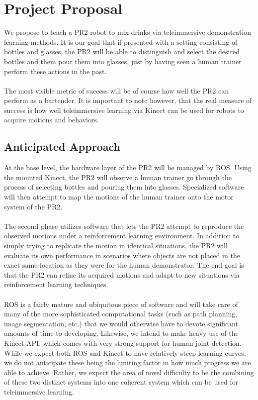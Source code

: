 \documentclass{sig-alternate}
\begin{document}
\section{Project Proposal}
\label{sec:project_proposal}We propose to teach a PR2 robot to mix drinks via
teleimmersive demonstration learning methods. It is our goal that if presented
with a setting consisting of bottles and glasses, the PR2 will be able to 
distinguish and select the desired bottles and them pour them into glasses, 
just by having seen a human
trainer perform these actions in the past.
\\
\\The most visible metric of success will be of course how well the PR2
can perform as a bartender. It is important to note however, that the real
measure of success is how well teleimmersive learning via Kinect can be used
for robots to acquire motions and behaviors.
\subsection{Anticipated Approach}
\label{subsec:approach}

At the base level, the hardware layer of the PR2 will be managed by ROS.
Using the mounted Kinect, the PR2 will observe a human trainer go
through the process of selecting bottles and pouring them into glasses. 
Specialized software will then attempt to map the motions of the human trainer
onto the motor system of the PR2.
\\
\\The second phase utilizes software that lets the PR2 attempt to reproduce
the observed motions under a reinforcement learning environment. In addition
to simply trying to replicate the motion in identical situations,
the PR2 will evaluate its own performance in scenarios where objects are not 
placed in the exact same location as they were for the human demonstrator.
The end goal is that the PR2 can refine its acquired motions and adapt to new
situations via reinforcement learning techniques. 
\\ 
\\ROS is a fairly mature and ubiquitous piece of software and will take care of
many of the more sophisticated computational tasks (such as path planning, 
image segmentation, etc.) that we would otherwise have to devote significant 
amounts of time to developing.  
Likewise, we intend to make heavy use of the Kinect API, which comes with very
strong support for human joint detection.
While we expect both ROS and Kinect to have relatively steep learning curves,
we do not anticipate these being the limiting factor in how much progress we
are able to achieve. 
Rather, we expect the area of novel difficulty to be the combining of these
two distinct systems into one coherent system which can be used for
teleimmersive learning.
\end{document}
